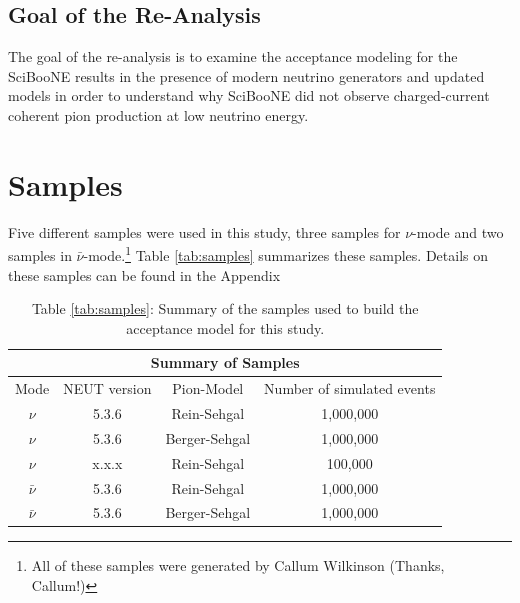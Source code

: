 \documentclass[11pt]{article}
\begin{document}
\subsection{Goal of the Re-Analysis}\label{sec:goals}
The goal of the re-analysis is to examine the acceptance modeling for the SciBooNE results in the presence of modern neutrino generators and updated models in order to understand why SciBooNE did not observe charged-current coherent pion production at low neutrino energy.



\section{Samples}\label{sec:samples}
Five different samples were used in this study, three samples for $\nu$-mode and two samples in $\bar{\nu}$-mode.\footnote{All of these samples were generated by Callum Wilkinson (Thanks, Callum!)} Table \ref*{tab:samples} summarizes these samples. Details on these samples can be found in the Appendix

\begin{center}
\begin{table}[htb]
	\begin{center}
	\begin{tabular}{c|c|c|c}
	\multicolumn{4}{c}{\textbf{Summary of Samples}} \\
	\hline \hline
	 Mode & NEUT version & Pion-Model & Number of simulated events\\
	\hline
	 $\nu$ & 5.3.6 & Rein-Sehgal & 1,000,000 \\
	\hline
	$\nu$ & 5.3.6 & Berger-Sehgal & 1,000,000 \\
	\hline
	$\nu$ & x.x.x & Rein-Sehgal & 100,000 \\
	\hline
	 $\bar{\nu}$ & 5.3.6 & Rein-Sehgal & 1,000,000 \\
	\hline
	$\bar{\nu}$ & 5.3.6 & Berger-Sehgal & 1,000,000 \\
	\hline
	\end{tabular}%
	\caption*{Table \ref*{tab:samples}: Summary of the samples used to build the acceptance model for this study.} 
	\end{center}
\end{table}\label{tab:samples}
\end{center}
\end{document}
